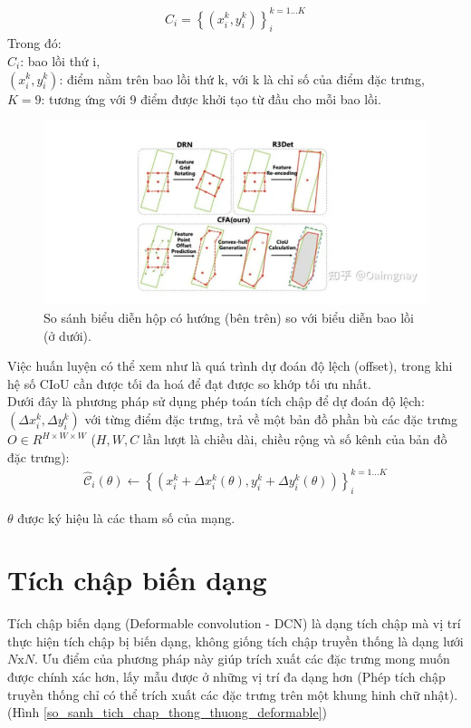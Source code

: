 \documentclass[12pt,a4paper,openany,oneside]{report}
\begin{document}
\begin{align} \label{convex_hull_definition}
		C_i=\left\{\left(x_i^k, y_i^k\right)\right\}_i^{k=1 \ldots K}
\end{align}
Trong đó:
	\\ \indent	 $C_i$: bao lồi thứ i,
	\\ \indent	 $\left(x_i^k, y_i^k\right)$: điểm nằm trên bao lồi thứ k, với k là chỉ số của điểm đặc trưng, 
	\\ \indent	$K = 9$: tương ứng với 9 điểm được khởi tạo từ đầu cho mỗi bao lồi.

\begin{figure}[ht!]
	\begin{center}
		\includegraphics[width=445px]{./compare_convex-hull_with_rectangle.jpg}
		\caption{So sánh biểu diễn hộp có hướng (bên trên) so với biểu diễn bao lồi (ở dưới).}
	\end{center}
\end{figure} 


Việc huấn luyện có thể xem như là quá trình dự đoán độ lệch (offset), trong khi hệ số CIoU cần được tối đa hoá để đạt được so khớp tối ưu nhất. \\
Dưới đây là phương pháp sử dụng phép toán tích chập để dự đoán độ lệch:
$\left(\Delta x_i^k, \Delta y_i^k\right)$
với từng điểm đặc trưng, trả về một bản đồ phần bù các đặc trưng
$O \in R^{H \times W \times W}$ ($H, W, C$ lần lượt là chiều dài, chiều rộng và số kênh của bản đồ đặc trưng):
\begin{align} \label{convex_hull_learn_offset}
	\hat{\mathcal{C}}_i(\theta) \leftarrow\left\{\left(x_i^k+\Delta x_i^k(\theta), y_i^k+\Delta y_i^k(\theta)\right)\right\}_i^{k=1 \ldots K}
\end{align}

\indent$\theta$ được ký hiệu là các tham số của mạng.

\section{Tích chập biến dạng}
Tích chập biến dạng (Deformable convolution - DCN) \cite{dai17dcn} là dạng tích chập mà vị trí thực hiện tích chập bị biến dạng, không giống tích chập truyền thống là dạng lưới $N\mathrm{x}N$. Ưu điểm của phương pháp này giúp trích xuất các đặc trưng mong muốn được chính xác hơn, lấy mẫu được ở những vị trí đa dạng hơn (Phép tích chập truyền thống chỉ có thể trích xuất các đặc trưng trên một khung hinh chữ nhật).(Hình \ref{so_sanh_tich_chap_thong_thuong_deformable})
\end{document}
